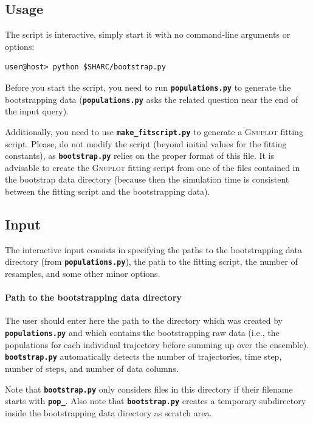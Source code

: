 \documentclass[a4paper,10pt,DIV=15,openany,twoside=false]{scrbook}
\newcommand{\ttt}[1]{\textbf{\texttt{#1}}}
\begin{document}
\subsection{Usage}

The script is interactive, simply start it with no command-line arguments or options:
\begin{verbatim}
user@host> python $SHARC/bootstrap.py
\end{verbatim}

Before you start the script, you need to run \ttt{populations.py} to generate the bootstrapping data (\ttt{populations.py} asks the related question near the end of the input query).

Additionally, you need to use \ttt{make\_fitscript.py} to generate a \textsc{Gnuplot} fitting script. Please, do not modify the script (beyond initial values for the fitting constants), as \ttt{bootstrap.py} relies on the proper format of this file.
It is advisable to create the \textsc{Gnuplot} fitting script from one of the files contained in the bootstrap data directory (because then the simulation time is consistent between the fitting script and the bootstrapping data).

\subsection{Input}

The interactive input consists in specifying the paths to the bootstrapping data directory (from \ttt{populations.py}), the path to the fitting script, the number of resamples, and some other minor options.

\paragraph{Path to the bootstrapping data directory}

The user should enter here the path to the directory which was created by \ttt{populations.py} and which contains the bootstrapping raw data (i.e., the populations for each individual trajectory before summing up over the ensemble).
\ttt{bootstrap.py} automatically detects the number of trajectories, time step, number of steps, and number of data columns.

Note that \ttt{bootstrap.py} only considers files in this directory if their filename starts with \ttt{pop\_}.
Also note that \ttt{bootstrap.py} creates a temporary subdirectory inside the bootstrapping data directory as scratch area.
\end{document}
